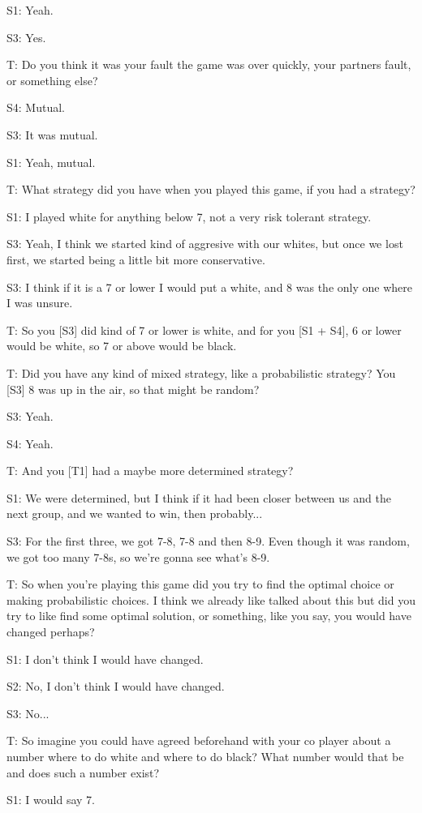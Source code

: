 \documentclass[a4paper,superscriptaddress,nofootinbib]{revtex4}
\begin{document}
S1: Yeah.

S3: Yes.

T: Do you think it was your fault the game was over quickly, your partners fault, or something else?

S4: Mutual.

S3: It was mutual.

S1: Yeah, mutual.

T: What strategy did you have when you played this game, if you had a strategy?

S1: I played white for anything below 7, not a very risk tolerant strategy.

S3: Yeah, I think we started kind of aggresive with our whites, but once we lost first, we started being a little bit more conservative.

S3: I think if it is a 7 or lower I would put a white, and 8 was the only one where I was unsure.

T: So you [S3] did kind of 7 or lower is white, and for you [S1 + S4], 6 or lower would be white, so 7 or above would be black.

T: Did you have any kind of mixed strategy, like a probabilistic strategy? You [S3] 8 was up in the air, so that might be random?

S3: Yeah.

S4: Yeah.

T: And you [T1] had a maybe more determined strategy?

S1: We were determined, but I think if it had been closer between us and the next group, and we wanted to win, then probably...

S3: For the first three, we got 7-8, 7-8 and then 8-9. Even though it was random, we got too many 7-8s, so we're gonna see what's 8-9.

T: So when you're playing this game did you try to find the optimal choice or making probabilistic choices. I think we already like talked about this but did you try to like find some optimal solution, or something, like you say, you would have changed perhaps?

S1: I don't think I would have changed.

S2: No, I don't think I would have changed.

S3: No...

T: So imagine you could have agreed beforehand with your co player about a number where to do white and where to do black? What number would that be and does such a number exist?

S1: I would say 7.
\end{document}
